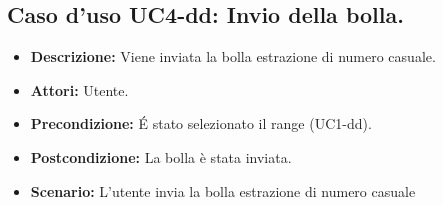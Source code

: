 \subsection{Caso d'uso UC4-dd: Invio della bolla.}
\begin{itemize}
\item[]\textbf{Descrizione:} Viene inviata la bolla estrazione di numero casuale.
\item[]\textbf{Attori:} Utente. 
\item[]\textbf{Precondizione:} \'E stato selezionato il range (UC1-dd). 
\item[]\textbf{Postcondizione:} La bolla è stata inviata. 
\item[]\textbf{Scenario:}
L'utente invia la bolla estrazione di numero casuale 
\end{itemize}

\clearpage


